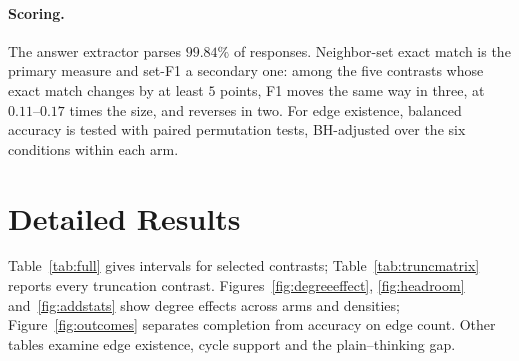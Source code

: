 \documentclass[11pt]{article}
\begin{document}
\paragraph{Scoring.} The answer extractor parses $99.84\%$ of responses. Neighbor-set exact match is the primary measure and set-F1 a secondary one: among the five contrasts whose exact match changes by at least $5$ points, F1 moves the same way in three, at $0.11$--$0.17$ times the size, and reverses in two. For edge existence, balanced accuracy is tested with paired permutation tests, BH-adjusted over the six conditions within each arm. %

\clearpage
\section{Detailed Results}
\label{app:detail}
Table~\ref{tab:full} gives intervals for selected contrasts; Table~\ref{tab:truncmatrix} reports every truncation contrast. Figures~\ref{fig:degreeeffect}, \ref{fig:headroom} and~\ref{fig:addstats} show degree effects across arms and densities; Figure~\ref{fig:outcomes} separates completion from accuracy on edge count. Other tables examine edge existence, cycle support and the plain--thinking gap.
\end{document}
